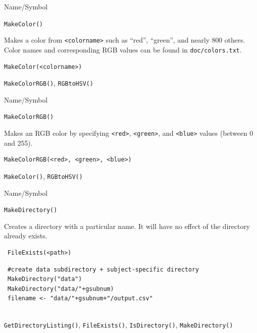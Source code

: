 \begin{desc}{Name/Symbol}
\item[Name/Symbol]	\verb+MakeColor()+

\item[Description] Makes a color from \verb+<colorname>+ such as
  ``red'', ``green'', and nearly 800 others.  Color names and
  corresponding RGB values can be found in \verb+doc/colors.txt+.

\item[Usage]
\begin{verbatim}
MakeColor(<colorname>)
\end{verbatim}

\item[Example]	

\item[See Also]	\verb+MakeColorRGB()+, \verb+RGBtoHSV()+
\end{desc}

\begin{desc}{Name/Symbol}
\item[Name/Symbol]	\verb+MakeColorRGB()+ 

\item[Description] Makes an RGB color by specifying \verb+<red>+,
  \verb+<green>+, and \verb+<blue>+ values (between 0 and 255).

\item[Usage]		
\begin{verbatim}
MakeColorRGB(<red>, <green>, <blue>)
\end{verbatim}

\item[Example]	

\item[See Also]	\verb+MakeColor()+, \verb+RGBtoHSV()+
\end{desc}


\begin{desc}{Name/Symbol}
\item[Name/Symbol]	\verb+MakeDirectory()+

\item[Description]	Creates a directory with a particular name. It will have no effect of the directory already exists.
\item[Usage]		
\begin{verbatim}
 FileExists(<path>)
\end{verbatim}

\item[Example]	
\begin{verbatim}
 #create data subdirectory + subject-specific directory
 MakeDirectory("data")
 MakeDirectory("data/"+gsubnum)
 filename <- "data/"+gsubnum+"/output.csv"
  
\end{verbatim}

\item[See Also]\verb+GetDirectoryListing()+, \verb+FileExists()+,       \verb+IsDirectory()+,        
   \verb+MakeDirectory()+      

\end{desc}



